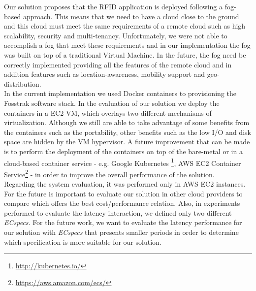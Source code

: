 Our solution proposes that the \gls{RFID} application is deployed following a fog-based approach.
This means that we need to have a cloud close to the ground and this cloud must meet the same
requirements of a remote cloud such as high scalability, security and multi-tenancy. Unfortunately,
we were not able to accomplish a fog that meet these requirements and in our implementation the fog
was built on top of a traditional Virtual Machine. In the future, the fog need be correctly
implemented providing all the features of the remote cloud and in addition features such as
location-awareness, mobility support and geo-distribution.\\

In the current implementation we used Docker containers to provisioning the Fosstrak software stack.
In the evaluation of our solution we deploy the containers in a \gls{EC2} \gls{VM}, which overlays two
different mechanisms of virtualization. Although we still are able to take advantage of some benefits
from the containers such as the portability, other benefits such as the low I/O and disk space are
hidden by the \gls{VM} hypervisor. A future improvement that can be made is to perform the deployment
of the containers on top of the bare-metal or in a cloud-based container service - e.g. Google Kubernetes
\footnote{\url{http://kubernetes.io/}}, \gls{AWS} \gls{EC2} Container Service\footnote{\url{https://aws.amazon.com/ecs/}} -
in order to improve the overall performance of the solution.\\

Regarding the system evaluation, it was performed only in \gls{AWS} \gls{EC2} instances. For the future
is important to evaluate our solution in other cloud providers to compare which offers the best cost/performance
relation. Also, in experiments performed to evaluate the latency interaction, we defined only two
different \textit{ECspecs}. For the future work, we want to evaluate the latency performance for
our solution with \textit{ECspecs} that presents smaller periods in order to determine which
specification is more suitable for our solution.
